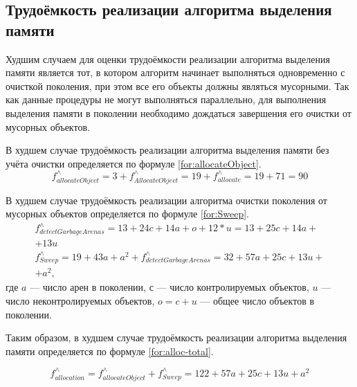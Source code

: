 \subsection{Трудоёмкость реализации алгоритма выделения памяти}

Худшим случаем для оценки трудоёмкости реализации алгоритма выделения памяти является тот, в котором алгоритм начинает выполняться одновременно с очисткой поколения, при этом все его объекты должны являться мусорными. Так как данные процедуры не могут выполняться параллельно, для выполнения выделения памяти в поколении необходимо дождаться завершения его очистки от мусорных объектов.

В худшем случае трудоёмкость реализации алгоритма выделения памяти без учёта очистки определяется по формуле \ref{for:allocateObject}.
\begin{equation}
	\label{for:allocateObject}
	f_{allocateObject}^{\wedge} = 3 + f_{AllocateObject}^{\wedge} = 19 + f_{allocate}^{\wedge} = 19 + 71 = 90
\end{equation}

В худшем случае трудоёмкость реализации алгоритма очистки поколения от мусорных объектов определяется по формуле \ref{for:Sweep}.
\begin{equation}
	\label{for:Sweep}
	\begin{array}{l}
		f_{detectGarbageArenas}^{\wedge} = 13 + 24c + 14a + o + 12*u = 13 + 25c + 14a +\\+ 13u\\
		f_{Sweep}^{\wedge} = 19 + 43a + a^2 + f_{detectGarbageArenas}^{\wedge} = 32 + 57a + 25c + 13u +\\+ a^2,
	\end{array}
\end{equation}
где $a$ --- число арен в поколении, $с$ --- число контролируемых объектов, $u$ --- число неконтролируемых объектов, $o = c + u$ --- общее число объектов в поколении.

Таким образом, в худшем случае трудоёмкость реализации алгоритма выделения памяти определяется по формуле \ref{for:alloc-total}.

\begin{equation}
	\label{for:alloc-total}
	f_{allocation}^{\wedge} = f_{allocateObject}^{\wedge} + f_{Sweep}^{\wedge} = 122 + 57a + 25c + 13u + a^2
\end{equation}



